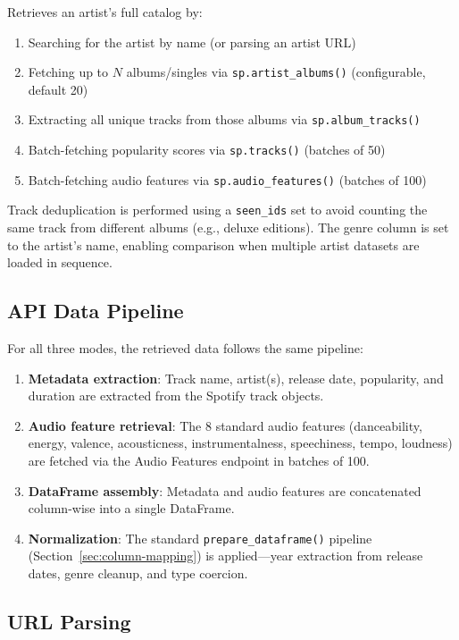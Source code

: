 \documentclass[12pt,a4paper]{article}
\begin{document}
Retrieves an artist's full catalog by:
\begin{enumerate}[noitemsep]
    \item Searching for the artist by name (or parsing an artist URL)
    \item Fetching up to $N$ albums/singles via \texttt{sp.artist\_albums()} (configurable, default 20)
    \item Extracting all unique tracks from those albums via \texttt{sp.album\_tracks()}
    \item Batch-fetching popularity scores via \texttt{sp.tracks()} (batches of 50)
    \item Batch-fetching audio features via \texttt{sp.audio\_features()} (batches of 100)
\end{enumerate}

Track deduplication is performed using a \texttt{seen\_ids} set to avoid counting the same track from different albums (e.g., deluxe editions). The genre column is set to the artist's name, enabling comparison when multiple artist datasets are loaded in sequence.

\subsection{API Data Pipeline}

For all three modes, the retrieved data follows the same pipeline:

\begin{enumerate}[noitemsep]
    \item \textbf{Metadata extraction}: Track name, artist(s), release date, popularity, and duration are extracted from the Spotify track objects.
    \item \textbf{Audio feature retrieval}: The 8 standard audio features (danceability, energy, valence, acousticness, instrumentalness, speechiness, tempo, loudness) are fetched via the Audio Features endpoint in batches of 100.
    \item \textbf{DataFrame assembly}: Metadata and audio features are concatenated column-wise into a single DataFrame.
    \item \textbf{Normalization}: The standard \texttt{prepare\_dataframe()} pipeline (Section~\ref{sec:column-mapping}) is applied---year extraction from release dates, genre cleanup, and type coercion.
\end{enumerate}

\subsection{URL Parsing}
\end{document}
